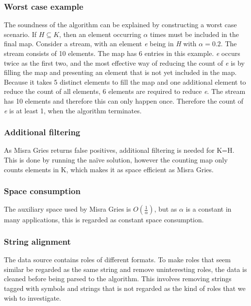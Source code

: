 \subsubsection{Worst case example}
The soundness of the algorithm can be explained by constructing a worst case scenario. If \(H \subseteq K\), then an element occurring \(\alpha\) times must be included in the final map. Consider a stream, with an element \textit{e} being in \textit{H} with \(\alpha = 0.2\). The stream consists of 10 elements. The map has 6 entries in this example. \textit{e} occurs twice as the first two, and the most effective way of reducing the count of \textit{e} is by filling the map and presenting an element that is not yet included in the map. Because it takes 5 distinct elements to fill the map and one additional element to reduce the count of all elements, 6 elements are required to reduce \textit{e}. The stream has 10 elements and therefore this can only happen once. Therefore the count of \textit{e} is at least 1, when the algorithm terminates.

\subsubsection{Additional filtering}
As Misra Gries returns false positives, additional filtering is needed for K=H. This is done by running the naïve solution, however the counting map only counts elements in K, which makes it as space efficient as Misra Gries.

\subsubsection{Space consumption}
The auxiliary space used by Misra Gries is \(O\left(\frac{1}{\alpha}\right)\), but as \(\alpha\) is a constant in many applications, this is regarded as constant space consumption.

\subsubsection{String alignment}
The data source contains roles of different formats. To make roles that seem similar be regarded as the same string and remove uninteresting roles, the data is cleaned before being parsed to the algorithm. This involves removing strings tagged with symbols and strings that is not regarded as the kind of roles that we wish to investigate.

